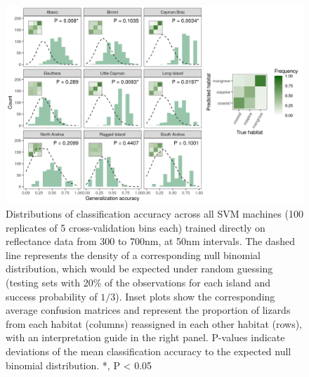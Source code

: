 \begin{figure}[H]
    \centering
	\includegraphics[width=\textwidth]{../analyses/04-machine learning/plots/classif_svm_refl.png}
	\caption{Distributions of classification accuracy across all SVM machines (100 replicates of 5 cross-validation bins each) trained directly on reflectance data from 300 to 700nm, at 50nm intervals. The dashed line represents the density of a corresponding null binomial distribution, which would be expected under random guessing (testing sets with 20\% of the observations for each island and success probability of $1/3$). Inset plots show the corresponding average confusion matrices and represent the proportion of lizards from each habitat (columns) reassigned in each other habitat (rows), with an interpretation guide in the right panel. P-values indicate deviations of the mean classification accuracy to the expected null binomial distribution. *, P < 0.05}
	\label{supfig:classif_svm_refl}
\end{figure}

